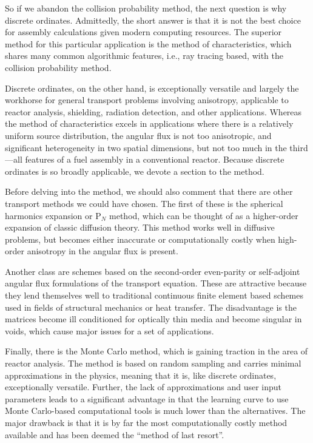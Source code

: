 So if we abandon the collision probability method, the next question is why discrete ordinates. Admittedly, the short answer is that it is not the best choice for assembly calculations given modern computing resources. The superior method for this particular application is the method of characteristics, which shares many common algorithmic features, i.e., ray tracing based, with the collision probability method. 

Discrete ordinates, on the other hand, is exceptionally versatile and largely the workhorse for general transport problems involving anisotropy, applicable to reactor analysis, shielding, radiation detection, and other applications. Whereas the method of characteristics excels in applications where there is a relatively uniform source distribution, the angular flux is not too anisotropic, and significant heterogeneity in two spatial dimensions, but not too much in the third---all features of a fuel assembly in a conventional reactor. Because discrete ordinates is so broadly applicable, we devote a section to the method.

Before delving into the method, we should also comment that there are other transport methods we could have chosen. The first of these is the spherical harmonics expansion or P$_N$ method, which can be thought of as a higher-order expansion of classic diffusion theory. This method works well in diffusive problems, but becomes either inaccurate or computationally costly when high-order anisotropy in the angular flux is present. 

Another class are schemes based on the second-order even-parity or self-adjoint angular flux formulations of the transport equation. These are attractive because they lend themselves well to traditional continuous finite element based schemes used in fields of structural mechanics or heat transfer. The disadvantage is the matrices become ill conditioned for optically thin media and become singular in voids, which cause major issues for a set of applications. 

Finally, there is the Monte Carlo method, which is gaining traction in the area of reactor analysis. The method is based on random sampling and carries minimal approximations in the physics, meaning that it is, like discrete ordinates, exceptionally versatile. Further, the lack of approximations and user input parameters leads to a significant advantage in that the learning curve to use Monte Carlo-based computational tools is much lower than the alternatives. The major drawback is that it is by far the most computationally costly method available and has been deemed the ``method of last resort''.

